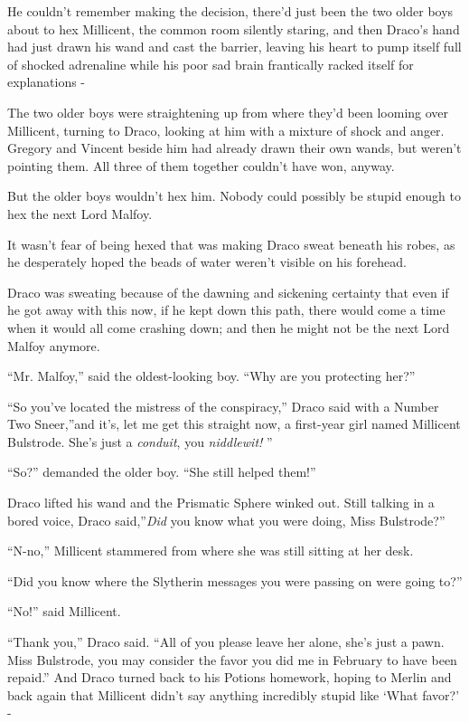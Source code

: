 He couldn't remember making the decision, there'd just been the two
older boys about to hex Millicent, the common room silently staring, and
then Draco's hand had just drawn his wand and cast the barrier, leaving
his heart to pump itself full of shocked adrenaline while his poor sad
brain frantically racked itself for explanations -

The two older boys were straightening up from where they'd been looming
over Millicent, turning to Draco, looking at him with a mixture of shock
and anger. Gregory and Vincent beside him had already drawn their own
wands, but weren't pointing them. All three of them together couldn't
have won, anyway.

But the older boys wouldn't hex him. Nobody could possibly be stupid
enough to hex the next Lord Malfoy.

It wasn't fear of being hexed that was making Draco sweat beneath his
robes, as he desperately hoped the beads of water weren't visible on his
forehead.

Draco was sweating because of the dawning and sickening certainty that
even if he got away with this now, if he kept down this path, there
would come a time when it would all come crashing down; and then he
might not be the next Lord Malfoy anymore.

``Mr. Malfoy,'' said the oldest-looking boy. ``Why are you protecting
her?''

``So you've located the mistress of the conspiracy,'' Draco said with a
Number Two Sneer,''and it's, let me get this straight now, a first-year
girl named Millicent Bulstrode. She's just a \emph{conduit}, you
\emph{niddlewit!} ''

``So?'' demanded the older boy. ``She still helped them!''

Draco lifted his wand and the Prismatic Sphere winked out. Still talking
in a bored voice, Draco said,''\emph{Did} you know what you were doing,
Miss Bulstrode?''

``N-no,'' Millicent stammered from where she was still sitting at her
desk.

``Did you know where the Slytherin messages you were passing on were
going to?''

``No!'' said Millicent.

``Thank you,'' Draco said. ``All of you please leave her alone, she's
just a pawn. Miss Bulstrode, you may consider the favor you did me in
February to have been repaid.'' And Draco turned back to his Potions
homework, hoping to Merlin and back again that Millicent didn't say
anything incredibly stupid like `What favor?' -

